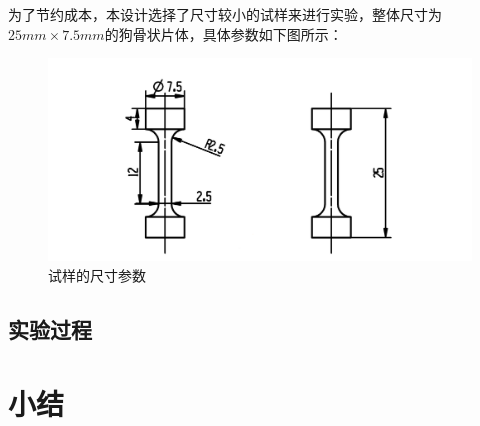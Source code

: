 为了节约成本，本设计选择了尺寸较小的试样来进行实验，整体尺寸为$ 25mm\times 7.5mm $的狗骨状片体，具体参数如下图所示：

\begin{figure}[h!]
	\centering
	\includegraphics[width=0.99\linewidth]{pic/试样}
	\caption{试样的尺寸参数}
	\label{fig:试样尺寸}
\end{figure}

%

\subsection{实验过程}


\section{小结}
